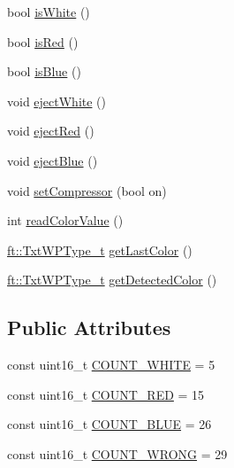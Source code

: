 \begin{DoxyCompactItemize}
\item 
bool \hyperlink{classft_1_1_txt_sorting_line_a063523af29aa877d70a03a0197cf5d81}{is\+White} ()
\item 
bool \hyperlink{classft_1_1_txt_sorting_line_a7425be7542f5aefdb3eab11d1cd23226}{is\+Red} ()
\item 
bool \hyperlink{classft_1_1_txt_sorting_line_a001c8a033cbae433f5afa0cf47bb7f88}{is\+Blue} ()
\item 
void \hyperlink{classft_1_1_txt_sorting_line_a990d079f2d79630797704ac94f0ad8ae}{eject\+White} ()
\item 
void \hyperlink{classft_1_1_txt_sorting_line_a16879b19114708f79815839b265acde8}{eject\+Red} ()
\item 
void \hyperlink{classft_1_1_txt_sorting_line_a7e127c26ac8276e122c8e50ffabb37ec}{eject\+Blue} ()
\item 
void \hyperlink{classft_1_1_txt_sorting_line_ab7b142243121432f8f35f44a9be6d752}{set\+Compressor} (bool on)
\item 
int \hyperlink{classft_1_1_txt_sorting_line_a1e11c8bc308f99b66bca1ca91cb53928}{read\+Color\+Value} ()
\item 
\hyperlink{namespaceft_a2d5bf01b2da29de3c061682f3195b5b2}{ft\+::\+Txt\+W\+P\+Type\+\_\+t} \hyperlink{classft_1_1_txt_sorting_line_a7db2229d84c37211a41bbdf92fdd3f0e}{get\+Last\+Color} ()
\item 
\hyperlink{namespaceft_a2d5bf01b2da29de3c061682f3195b5b2}{ft\+::\+Txt\+W\+P\+Type\+\_\+t} \hyperlink{classft_1_1_txt_sorting_line_a2db3e1bf294440672b5a38bfde73b82e}{get\+Detected\+Color} ()
\end{DoxyCompactItemize}
\subsection*{Public Attributes}
\begin{DoxyCompactItemize}
\item 
const uint16\+\_\+t \hyperlink{classft_1_1_txt_sorting_line_a5ee53a53b47614a5e2992775f335da97}{C\+O\+U\+N\+T\+\_\+\+W\+H\+I\+TE} = 5
\item 
const uint16\+\_\+t \hyperlink{classft_1_1_txt_sorting_line_a4be5b5900a7795a1ef19e66051b976bf}{C\+O\+U\+N\+T\+\_\+\+R\+ED} = 15
\item 
const uint16\+\_\+t \hyperlink{classft_1_1_txt_sorting_line_a9b7c86ed17d878b04c5fdcaba030853b}{C\+O\+U\+N\+T\+\_\+\+B\+L\+UE} = 26
\item 
const uint16\+\_\+t \hyperlink{classft_1_1_txt_sorting_line_a960ec0a91d686f45bbc073ef71f2dbbd}{C\+O\+U\+N\+T\+\_\+\+W\+R\+O\+NG} = 29
\end{DoxyCompactItemize}
